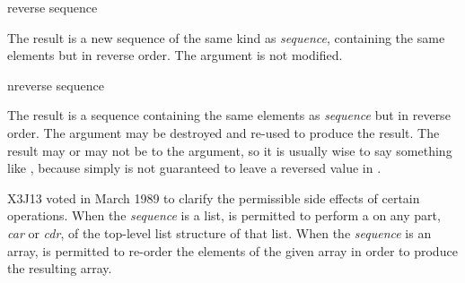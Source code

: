 \begin{defun}[Function]
reverse sequence

The result is a new sequence of the same kind as {\it sequence},
containing the same elements but in reverse order.
The argument is not modified.
\end{defun}

\begin{defun}[Function]
nreverse sequence

The result is a sequence containing the same elements as {\it sequence}
but in reverse order.  The argument may be destroyed and re-used to
produce the result.  The result may or may not be  to the
argument, so it is usually wise to say something like
, because simply  is not
guaranteed to leave a reversed value in .

\begin{newer}
X3J13 voted in March 1989 
to clarify the permissible side effects of certain operations.
When the {\it sequence} is a list,
 is permitted to perform a  on any part,
{\it car} or {\it cdr}, of the top-level list structure of that list.
When the {\it sequence} is an array,
 is permitted to re-order the elements of the given array
in order to produce the resulting array.
\end{newer}
\end{defun}

